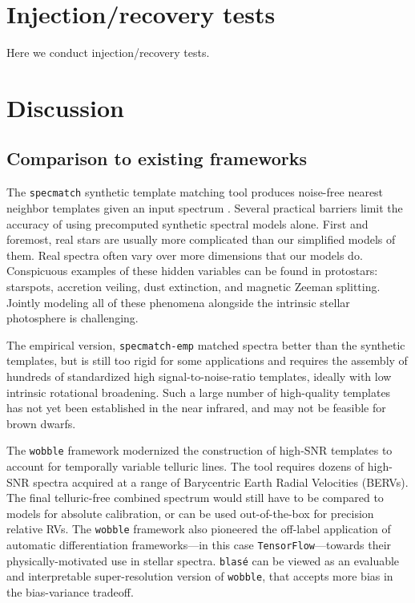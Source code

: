 \documentclass[modern]{aastex631}
\begin{document}
\section{Injection/recovery tests}\label{secInjRec}
Here we conduct injection/recovery tests.

\section{Discussion}\label{secDiscuss}

\subsection{Comparison to existing frameworks}

The \texttt{specmatch} synthetic template matching tool produces noise-free nearest neighbor templates given an input spectrum \citep{2015PhDT........82P}.  Several practical barriers limit the accuracy of using precomputed synthetic spectral models alone. First and foremost, real stars are usually more complicated than our simplified models of them. Real spectra often vary over more dimensions that our models do.  Conspicuous examples of these hidden variables can be found in protostars: starspots, accretion veiling, dust extinction, and magnetic Zeeman splitting. Jointly modeling all of these phenomena alongside the intrinsic stellar photosphere is challenging.

The empirical version, \texttt{specmatch-emp} \citep{2017ApJ...836...77Y} matched spectra better than the synthetic templates, but is still too rigid for some applications and requires the assembly of hundreds of standardized high signal-to-noise-ratio templates, ideally with low intrinsic rotational broadening.  Such a large number of high-quality templates has not yet been established in the near infrared, and may not be feasible for brown dwarfs.

The \texttt{wobble} framework \citep{2019AJ....158..164B} modernized the construction of high-SNR templates to account for temporally variable telluric lines. The tool requires dozens of high-SNR spectra acquired at a range of Barycentric Earth Radial Velocities (BERVs).  The final telluric-free combined spectrum would still have to be compared to models for absolute calibration, or can be used out-of-the-box for precision relative RVs.  The \texttt{wobble} framework also pioneered the off-label application of automatic differentiation frameworks---in this case \texttt{TensorFlow}---towards their physically-motivated use in stellar spectra.  \texttt{blas\'e} can be viewed as an evaluable and interpretable super-resolution version of \texttt{wobble}, that accepts more bias in the bias-variance tradeoff.
\end{document}
